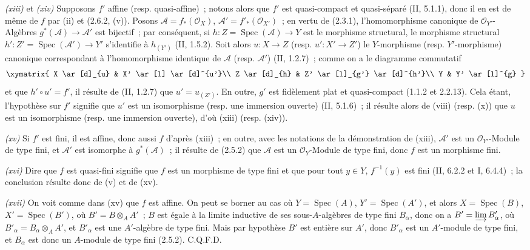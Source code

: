 \documentclass[10pt,oneside]{book}
\newcommand{\oldpage}[2][]{%
  \setcounter{footnote}{0}%
  \marginpar{\scriptsize\textbf{#1}~|~#2}\ignorespaces}
\begin{document}
\emph{(xiii)} et \emph{(xiv)} Supposons $f'$ affine (resp. quasi-affine)~;
notons alors que $f'$ est quasi-compact et quasi-séparé (II, 5.1.1), donc il
en est de même de $f$ par (ii) et (2.6.2, (v)). Posons
$\mathcal A=f_*(\mathcal O_X)$, $\mathcal A'=f'_*(\mathcal O_{X'})$~; en
vertu de (2.3.1), l'homomorphisme canonique de $\mathcal O_{Y'}$-Algèbres
$g^*(\mathcal A)\to\mathcal A'$ est bijectif~; par conséquent, si
$h:Z=\operatorname{Spec}(\mathcal A)\to Y$ est le morphisme structural, le
morphisme structural $h':Z'=\operatorname{Spec}(\mathcal A')\to Y'$
s'identifie à $h_{(Y')}$ (II, 1.5.2). Soit alors $u:X\to Z$ (resp.
$u':X'\to Z'$) le $Y$-morphisme (resp. $Y'$-morphisme) canonique
correspondant à l'homomorphisme identique de $\mathcal A$ (resp.
$\mathcal A'$) (II, 1.2.7)~; comme on a le diagramme commutatif
\[
\xymatrix{
X \ar[d]_{u} & X' \ar[l] \ar[d]^{u'}\\
Z \ar[d]_{h} & Z' \ar[l]_{g'} \ar[d]^{h'}\\
Y & Y' \ar[l]^{g}
}
\]
et que $h'\circ u'=f'$, il résulte de (II, 1.2.7) que $u'=u_{(Z')}$. En
outre, $g'$ est fidèlement plat et quasi-compact (1.1.2 et 2.2.13). Cela
étant, l'hypothèse sur $f'$ signifie que $u'$ est un isomorphisme (resp. une
immersion ouverte) (II, 5.1.6)~; il résulte alors de (viii) (resp. (x)) que
$u$ est un isomorphisme (resp. une immersion ouverte), d'où (xiii) (resp.
(xiv)).

\oldpage[IV-2]{32}
\emph{(xv)} Si $f'$ est fini, il est affine, donc aussi $f$ d'après (xiii)~;
en outre, avec les notations de la démonstration de (xiii), $\mathcal A'$ est
un $\mathcal O_{Y'}$-Module de type fini, et $\mathcal A'$ est isomorphe à
$g^*(\mathcal A)$~; il résulte de (2.5.2) que $\mathcal A$ est un
$\mathcal O_Y$-Module de type fini, donc $f$ est un morphisme fini.

\emph{(xvi)} Dire que $f$ est quasi-fini signifie que $f$ est un morphisme de
type fini et que pour tout $y\in Y$, $f^{-1}(y)$ est fini (II, 6.2.2 et I,
6.4.4)~; la conclusion résulte donc de (v) et de (xv).

\emph{(xvii)} On voit comme dans (xv) que $f$ est affine. On peut se borner
au cas où $Y=\operatorname{Spec}(A)$, $Y'=\operatorname{Spec}(A')$, et alors
$X=\operatorname{Spec}(B)$, $X'=\operatorname{Spec}(B')$, où
$B'=B\otimes_A A'$~; $B$ est égale à la limite inductive de ses
sous-$A$-algèbres de type fini $B_\alpha$, donc on a
$B'=\varinjlim B'_\alpha$, où $B'_\alpha=B_\alpha\otimes_A A'$, et
$B'_\alpha$ est une $A'$-algèbre de type fini. Mais par hypothèse $B'$ est
entière sur $A'$, donc $B'_\alpha$ est un $A'$-module de type fini, et
$B_\alpha$ est donc un $A$-module de type fini (2.5.2). C.Q.F.D.
\end{document}
